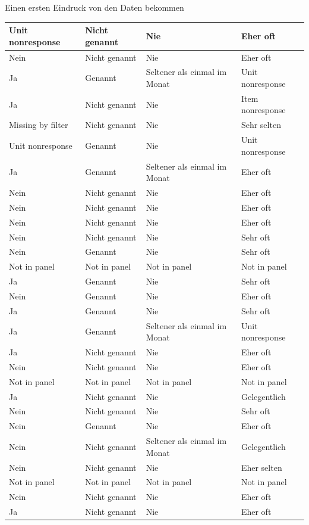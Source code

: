 \documentclass[ignorenonframetext,]{beamer}
\begin{document}
\begin{frame}{Einen ersten Eindruck von den Daten bekommen}
\begin{tabular}{l|l|l|l}
\hline
Unit nonresponse & Nicht genannt & Nie & Eher oft\\
\hline
Nein & Nicht genannt & Nie & Eher oft\\
\hline
Ja & Genannt & Seltener als einmal im Monat & Unit nonresponse\\
\hline
Ja & Nicht genannt & Nie & Item nonresponse\\
\hline
Missing by filter & Nicht genannt & Nie & Sehr selten\\
\hline
Unit nonresponse & Genannt & Nie & Unit nonresponse\\
\hline
Ja & Genannt & Seltener als einmal im Monat & Eher oft\\
\hline
Nein & Nicht genannt & Nie & Eher oft\\
\hline
Nein & Nicht genannt & Nie & Eher oft\\
\hline
Nein & Nicht genannt & Nie & Eher oft\\
\hline
Nein & Nicht genannt & Nie & Sehr oft\\
\hline
Nein & Genannt & Nie & Sehr oft\\
\hline
Not in panel & Not in panel & Not in panel & Not in panel\\
\hline
Ja & Genannt & Nie & Sehr oft\\
\hline
Nein & Genannt & Nie & Eher oft\\
\hline
Ja & Genannt & Nie & Sehr oft\\
\hline
Ja & Genannt & Seltener als einmal im Monat & Unit nonresponse\\
\hline
Ja & Nicht genannt & Nie & Eher oft\\
\hline
Nein & Nicht genannt & Nie & Eher oft\\
\hline
Not in panel & Not in panel & Not in panel & Not in panel\\
\hline
Ja & Nicht genannt & Nie & Gelegentlich\\
\hline
Nein & Nicht genannt & Nie & Sehr oft\\
\hline
Nein & Genannt & Nie & Eher oft\\
\hline
Nein & Nicht genannt & Seltener als einmal im Monat & Gelegentlich\\
\hline
Nein & Nicht genannt & Nie & Eher selten\\
\hline
Not in panel & Not in panel & Not in panel & Not in panel\\
\hline
Nein & Nicht genannt & Nie & Eher oft\\
\hline
Ja & Nicht genannt & Nie & Eher oft\\

\end{tabular}
\end{frame}
\end{document}
